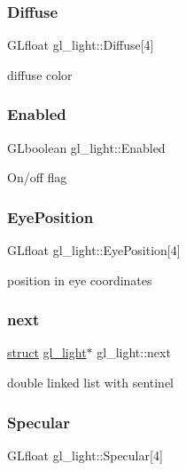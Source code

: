 \subsubsection{\texorpdfstring{Diffuse}{Diffuse}}
{\footnotesize\ttfamily G\+Lfloat gl\+\_\+light\+::\+Diffuse\mbox{[}4\mbox{]}}

diffuse color \mbox{\label{structgl__light_aaeb33d2b9f64eb8b0908fb323344cd2b}} 
\subsubsection{\texorpdfstring{Enabled}{Enabled}}
{\footnotesize\ttfamily G\+Lboolean gl\+\_\+light\+::\+Enabled}

On/off flag \mbox{\label{structgl__light_a1652e75b3f3cdc36c3f7cdda9144535d}} 
\subsubsection{\texorpdfstring{Eye\+Position}{EyePosition}}
{\footnotesize\ttfamily G\+Lfloat gl\+\_\+light\+::\+Eye\+Position\mbox{[}4\mbox{]}}

position in eye coordinates \mbox{\label{structgl__light_a1bee61d6a54e9c529b802113ea644e30}} 
\subsubsection{\texorpdfstring{next}{next}}
{\footnotesize\ttfamily \hyperlink{interfacestruct}{struct} \hyperlink{structgl__light}{gl\+\_\+light}$\ast$ gl\+\_\+light\+::next}

double linked list with sentinel \mbox{\label{structgl__light_a56f6f30682435ff99d6ba3b772a1dd1d}} 
\subsubsection{\texorpdfstring{Specular}{Specular}}
{\footnotesize\ttfamily G\+Lfloat gl\+\_\+light\+::\+Specular\mbox{[}4\mbox{]}}

